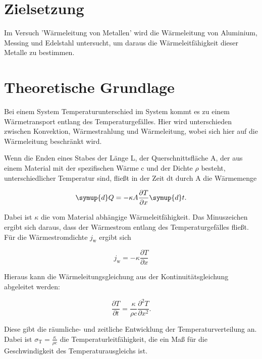 \section{Zielsetzung}
    Im Versuch 'Wärmeleitung von Metallen' wird die Wärmeleitung von Aluminium, Messing und Edelstahl untersucht,
    um daraus die Wärmeleitfähigkeit dieser Metalle zu bestimmen.

    \section{Theoretische Grundlage}
      Bei einem System Temperaturunterschied im System kommt es zu einem Wärmetransport entlang des Temperaturgefälles.
      Hier wird unterschieden zwischen Konvektion, Wärmestrahlung und Wärmeleitung, wobei sich hier auf die Wärmeleitung beschränkt wird.

      \noindent Wenn die Enden eines Stabes der Länge L, der Querschnittsfläche A, der aus einem Material mit der spezifischen Wärme c und der Dichte $\rho$ besteht, unterschiedlicher Temperatur sind,
      fließt in der Zeit dt durch A die Wärmemenge 

      \begin{equation}
      \symup{d}Q = - \kappa A \frac{\partial T}{\partial x} \symup{d}t .
        \label{eqn:waermemenge}
      \end{equation}

      \noindent Dabei ist $\kappa$ die vom Material abhängige Wärmeleitfähigkeit. 
      Das Minuszeichen ergibt sich daraus, dass der Wärmestrom entlang des Temperaturgefälles fließt.
      Für die Wärmestromdichte $j_\text{w}$ ergibt sich

      \begin{equation}
      j_\text{w}=-\kappa \frac{\partial T}{\partial x}
        \label{eqn:waermestromdichte}
      \end{equation}       
      
      \noindent Hieraus kann die Wärmeleitungsgleichung aus der Kontinuitätsgleichung abgeleitet werden:

      \begin{equation}
      \frac{\partial T}{\partial t} = \frac{\kappa}{\rho c} \frac{\partial^2 T}{\partial x^2}.
        \label{eqn:waermeleitungsgleichung}
      \end{equation}  

      \noindent Diese gibt die räumliche- und zeitliche Entwicklung der Temperaturverteilung an.
      Dabei ist $\sigma_\text{T} = \frac{\kappa}{\rho c}$ die Temperaturleitfähigkeit, die ein Maß für die Geschwindigkeit des Temperaturausgleichs ist.

